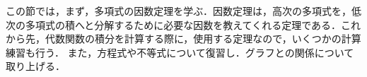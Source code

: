 \begin{comment}
\begin{table}[!h]
	\centering
	\caption{代数式}
	\[
		\text{代数式}
		\begin{cases}
			\text{有理式}
			\begin{cases}
				\text{多項式} 
				\begin{cases}
					\text{定数式} & 3, c\\
					\text{一次式} & ax+b \\
					\text{二次式} & ax^2+bx+c \\
					\text{$n$次式} & \sum_{i=0}^{n}a_ix^i
				\end{cases} \\
				\text{分数式} & \hspace*{-23mm}a/x
			\end{cases} \\
			\text{無理式} & \hspace*{-10mm}\sqrt{x}
		\end{cases}
	\]
\end{table}
\end{comment}

この節では，まず，多項式の因数定理を学ぶ．因数定理は，高次の多項式を，低次の多項式の積へと分解するために必要な因数を教えてくれる定理である．これから先，代数関数の積分を計算する際に，使用する定理なので，いくつかの計算練習も行う．
また，方程式や不等式について復習し．グラフとの関係について取り上げる．

